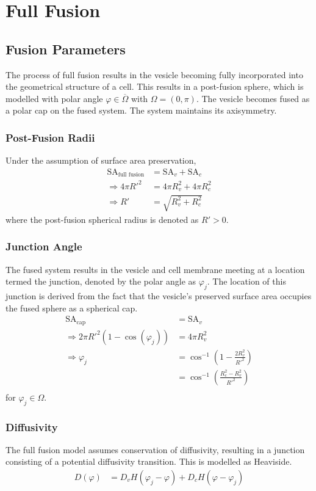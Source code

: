 \documentclass{report}
\newcommand\Par[1]{{ \left({#1}\right) }}
\newcommand\R{{ R' }}
\newcommand\SA{{ \text{SA} }}
\begin{document}
\chapter{Full Fusion}
\section{Fusion Parameters}
The process of full fusion results in the vesicle becoming fully incorporated into the geometrical structure of a cell. This results in a post-fusion sphere, which is modelled with polar angle $\varphi \in \overline\Omega$ with $\Omega = (0, \pi)$. The vesicle becomes fused as a polar cap on the fused system. The system maintains its axisymmetry.

\subsection{Post-Fusion Radii}
Under the assumption of surface area preservation,
\begin{align*}
	\SA_\text{full fusion} &= \SA_v + \SA_c \\
	\Rightarrow 4\pi \R^2 &= 4\pi R_v^2 + 4\pi R_c^2 \\
	\Rightarrow \R &= \sqrt{R_v^2 + R_c^2}
\end{align*}
where the post-fusion spherical radius is denoted as $\R > 0$.

\subsection{Junction Angle}
The fused system results in the vesicle and cell membrane meeting at a location termed the junction, denoted by the polar angle as $\varphi_j$. The location of this junction is derived from the fact that the vesicle's preserved surface area occupies the fused sphere as a spherical cap.
\begin{align*}
	\SA_\text{cap} &= \SA_v \\
	\Rightarrow 2\pi \R^2 \Par{1 - \cos(\varphi_j)} &= 4\pi R_v^2 \\
	\Rightarrow \varphi_j &= \cos^{-1}\Par{1 - \frac{2R_v^2}{\R^2}} \\
	&= \cos^{-1}\Par{\frac{R_c^2 - R_v^2}{\R^2}} \\
\end{align*}
for $\varphi_j \in \Omega$.

\subsection{Diffusivity}
The full fusion model assumes conservation of diffusivity, resulting in a junction consisting of a potential diffusivity transition. This is modelled as Heaviside.
\begin{align*}
	D(\varphi) &= D_v H(\varphi_j - \varphi) + D_c H(\varphi - \varphi_j)
\end{align*}
\end{document}
